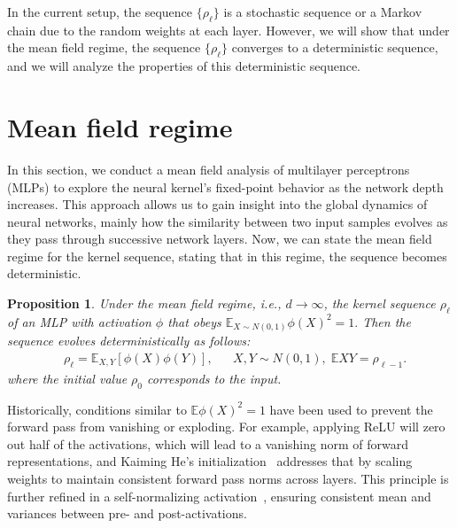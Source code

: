 \documentclass[twoside]{article}
\newcommand{\E}{\mathbb{E}}
\newtheorem{proposition}{Proposition}
\theoremstyle{definition}
\begin{document}
In the current setup, the sequence $\{\rho_\ell\}$ is a stochastic sequence or a Markov chain due to the random weights at each layer. 
However, we will show that under the mean field regime, the sequence $\{\rho_\ell\}$ converges to a deterministic sequence, and we will analyze the properties of this deterministic sequence.


\section{Mean field regime}

In this section, we conduct a mean field analysis of multilayer perceptrons (MLPs) to explore the neural kernel's fixed-point behavior as the network depth increases. This approach allows us to gain insight into the global dynamics of neural networks, mainly how the similarity between two input samples evolves as they pass through successive network layers.
Now, we can state the mean field regime for the kernel sequence, stating that in this regime, the sequence becomes deterministic.

\begin{proposition}
\label{prop:mean_field_kernel}
Under the mean field regime, i.e., $d \to \infty$, the kernel sequence $\rho_\ell$ of an MLP with activation $\phi$ that obeys $\E_{X\sim N(0,1)} \phi(X)^2=1.$ Then the sequence evolves deterministically as follows:
\begin{align*}
&\rho_{\ell} = \mathbb{E}_{X,Y}[\phi(X)\phi(Y)], && 
 X, Y\sim N(0,1),\; \E XY = \rho_{\ell-1}.
\end{align*}
where the initial value $\rho_0$ corresponds to the input. 

\end{proposition}

Historically, conditions similar to $\E \phi(X)^2=1$ have been used to prevent the forward pass from vanishing or exploding. For example, applying ReLU will zero out half of the activations, which will lead to a vanishing norm of forward representations, and Kaiming He's initialization~\citet{he2016deep} addresses that by scaling weights to maintain consistent forward pass norms across layers. This principle is further refined in a self-normalizing activation~\citet{klambauer2017self}, ensuring consistent mean and variances between pre- and post-activations. 
\end{document}
